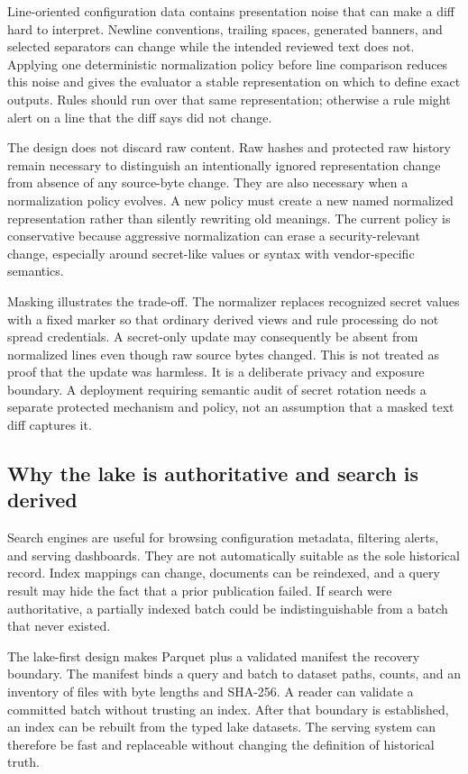 Line-oriented configuration data contains presentation noise that can make a diff hard to interpret. Newline conventions, trailing spaces, generated banners, and selected separators can change while the intended reviewed text does not. Applying one deterministic normalization policy before line comparison reduces this noise and gives the evaluator a stable representation on which to define exact outputs. Rules should run over that same representation; otherwise a rule might alert on a line that the diff says did not change.

The design does not discard raw content. Raw hashes and protected raw history remain necessary to distinguish an intentionally ignored representation change from absence of any source-byte change. They are also necessary when a normalization policy evolves. A new policy must create a new named normalized representation rather than silently rewriting old meanings. The current policy is conservative because aggressive normalization can erase a security-relevant change, especially around secret-like values or syntax with vendor-specific semantics.

Masking illustrates the trade-off. The normalizer replaces recognized secret values with a fixed marker so that ordinary derived views and rule processing do not spread credentials. A secret-only update may consequently be absent from normalized lines even though raw source bytes changed. This is not treated as proof that the update was harmless. It is a deliberate privacy and exposure boundary. A deployment requiring semantic audit of secret rotation needs a separate protected mechanism and policy, not an assumption that a masked text diff captures it.

\subsection{Why the lake is authoritative and search is derived}

Search engines are useful for browsing configuration metadata, filtering alerts, and serving dashboards. They are not automatically suitable as the sole historical record. Index mappings can change, documents can be reindexed, and a query result may hide the fact that a prior publication failed. If search were authoritative, a partially indexed batch could be indistinguishable from a batch that never existed.

The lake-first design makes Parquet plus a validated manifest the recovery boundary. The manifest binds a query and batch to dataset paths, counts, and an inventory of files with byte lengths and SHA-256. A reader can validate a committed batch without trusting an index. After that boundary is established, an index can be rebuilt from the typed lake datasets. The serving system can therefore be fast and replaceable without changing the definition of historical truth.

